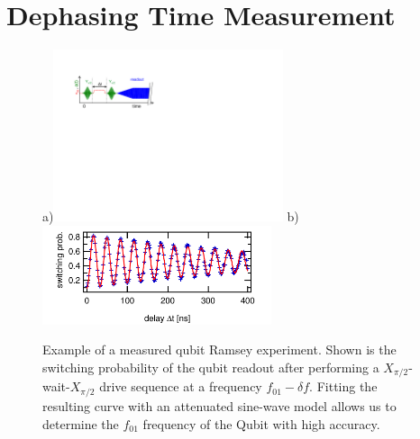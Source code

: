 \section{Dephasing Time Measurement}

\begin{figure}[ht!]
\centering
a)\includegraphics[width=0.6\textwidth]{"./material/figures/measurement/qubit_ramsey_oscillation"}
b)\includegraphics[width=0.6\textwidth]{"./data/ct5/2011_04_21 - grover and tomo/example - qubit 2 ramsey"}
\caption[]{Example of a measured qubit Ramsey experiment. Shown is the switching probability of the qubit readout after performing a $X_{\pi/2}$-wait-$X_{\pi/2}$ drive sequence at a frequency $f_{01}-\delta f$. Fitting the resulting curve with an attenuated sine-wave model allows us to determine the $f_{01}$ frequency of the Qubit with high accuracy.}
\label{fig:qubit_ramsey_example}
\end{figure}

